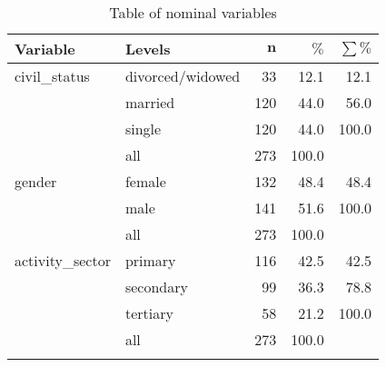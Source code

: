 {\footnotesize
\begin{longtable}{llrrr}
\caption{Table of nominal variables} \\ 
 \textbf{Variable} & \textbf{Levels} & $\mathbf{n}$ & $\mathbf{\%}$ & $\mathbf{\sum \%}$ \\ 
  \hline
civil\_status & divorced/widowed & 33 & 12.1 & 12.1 \\ 
   & married & 120 & 44.0 & 56.0 \\ 
   & single & 120 & 44.0 & 100.0 \\ 
   \hline
 & all & 273 & 100.0 &  \\ 
   \hline
\hline
gender & female & 132 & 48.4 & 48.4 \\ 
   & male & 141 & 51.6 & 100.0 \\ 
   \hline
 & all & 273 & 100.0 &  \\ 
   \hline
\hline
activity\_sector & primary & 116 & 42.5 & 42.5 \\ 
   & secondary & 99 & 36.3 & 78.8 \\ 
   & tertiary & 58 & 21.2 & 100.0 \\ 
   \hline
 & all & 273 & 100.0 &  \\ 
   \hline
\hline
\hline
\label{tab:table5}
\end{longtable}
}

